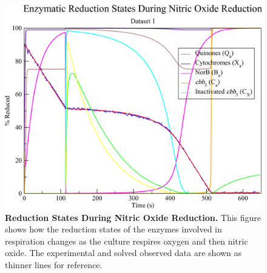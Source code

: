\begin{figure}[tbp]
 \centering
 \includegraphics[width=15cm, clip=true]{./06-noreduction/data/aer-no-sim-redox.pdf}
 \caption[{Reduction States During Nitric Oxide Reduction.}]{{\bf Reduction States During Nitric Oxide Reduction.} This figure shows how the reduction states of the enzymes involved in respiration changes as the culture respires oxygen and then nitric oxide. The experimental and solved observed data are shown as thinner lines for reference.}
 \label{fig:nosimredox}
\end{figure}

